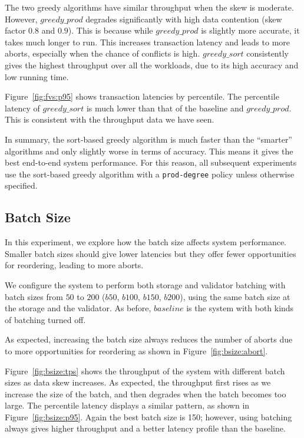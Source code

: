 The two greedy algorithms have similar throughput when the skew is moderate. However,  $greedy\_prod$ degrades significantly with high data contention (skew factor $0.8$ and $0.9$). This is because while $greedy\_prod$ is slightly more accurate, it takes much longer to run. This increases transaction latency and leads to more aborts, especially when the chance of conflicts is high. $greedy\_sort$ consistently gives the highest throughput over all the workloads, due to its high accuracy and low running time. 

Figure~\ref{fig:fvs:p95} shows transaction latencies by percentile. The percentile latency of $greedy\_sort$ is much lower than that of the baseline and $greedy\_prod$. This is consistent with the throughput data we have seen.

In summary, the sort-based greedy algorithm is much faster than the ``smarter'' algorithms and only slightly worse in terms of accuracy. This means it gives the best end-to-end system performance. For this reason, all subsequent experiments use the sort-based greedy algorithm with a \texttt{prod-degree} policy unless otherwise specified.


\subsection{Batch Size}

In this experiment, we explore how the batch size affects system performance. 
Smaller batch sizes should give lower latencies but they offer fewer opportunities for reordering, leading to more aborts. 

We configure the system to perform both storage and validator batching with batch sizes from $50$ to $200$ ($b50$, $b100$, $b150$, $b200$), using the same batch size at the storage and the validator. As before, $baseline$ is the system with both kinds of batching turned off. 

As expected, increasing the batch size always reduces the number of aborts due to more opportunities for reordering as shown in Figure~\ref{fig:bsize:abort}. 

Figure~\ref{fig:bsize:tps} shows the throughput of the system with different batch sizes as data skew increases. As expected, the throughput first rises as we increase the size of the batch, and then degrades when the batch becomes too large.
The percentile latency displays a similar pattern, as shown in Figure~\ref{fig:bsize:p95}. Again the best batch size is 150; however, using batching always gives higher throughput and a better latency profile than the baseline.


